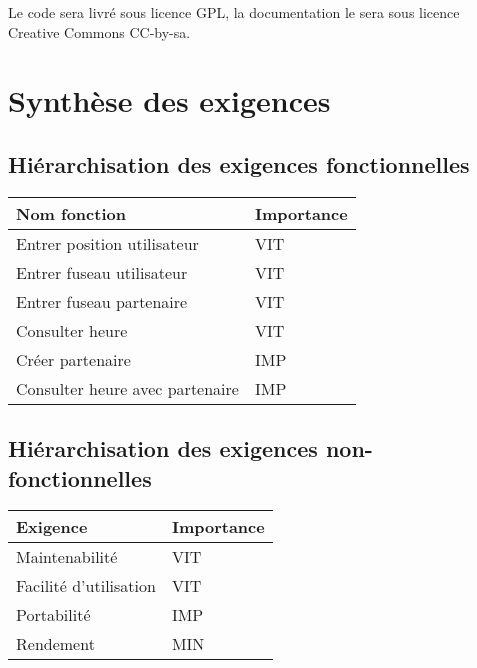 \documentclass[majeure,gl]{tb}
\begin{document}
Le code sera livré sous licence GPL, la documentation le sera sous
licence Creative Commons CC-by-sa.


\section{Synthèse des exigences}

\subsection{Hiérarchisation des exigences fonctionnelles} 
\label{sec:hiera}





\begin{center}
\begin{tabular}[c]{|p{10cm}|l|}
\hline
\textbf{Nom fonction} & \textbf{Importance}\\
\hline
Entrer position utilisateur
& VIT\\
\hline
Entrer fuseau utilisateur
& VIT\\
\hline
Entrer fuseau partenaire
& VIT\\
\hline
Consulter heure
& VIT\\
\hline
\hline
Créer partenaire
& IMP\\
\hline
Consulter heure avec partenaire
& IMP\\
\hline



\end{tabular}
\end{center}

\subsection{Hiérarchisation des exigences non-fonctionnelles} 


\begin{center}
\begin{tabular}[c]{|p{10cm}|l|}
\hline
\textbf{Exigence} & \textbf{Importance}\\
\hline
Maintenabilité
&VIT\\
\hline
Facilité d'utilisation
&VIT\\
\hline
Portabilité
&IMP\\
\hline
Rendement
&MIN\\
\hline
\end{tabular}
\end{center}
\end{document}
